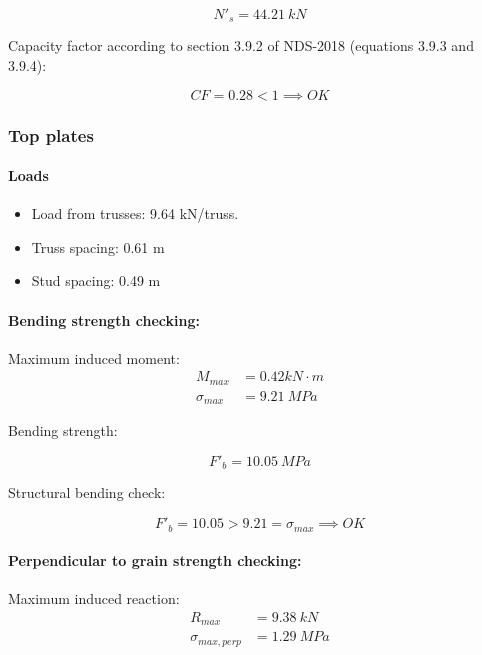 \begin{equation}
  N'_s= 44.21\ kN
\end{equation}

\noindent Capacity factor according to section 3.9.2 of NDS-2018 (equations 3.9.3 and 3.9.4):

\begin{equation}
  CF= 0.28 < 1 \implies OK
\end{equation}

\subsubsection{Top plates}

\paragraph{Loads}

\begin{itemize}
\item Load from trusses: 9.64 kN/truss.
\item Truss spacing: 0.61 m
\item Stud spacing: 0.49 m
\end{itemize}

\paragraph{Bending strength checking:}

\noindent Maximum induced moment:
\begin{align}
  M_{max}&= 0.42 kN \cdot m\\
  \sigma_{max}&= 9.21\ MPa
\end{align}

\noindent Bending strength:

\begin{equation}
  F'_b= 10.05\ MPa
\end{equation}

\noindent Structural bending check:

\begin{equation}
F'_b = 10.05 > 9.21 = \sigma_{max} \implies OK
\end{equation}

\paragraph{Perpendicular to grain strength checking:}

\noindent Maximum induced reaction:
\begin{align}
  R_{max}&= 9.38\ kN\\
  \sigma_{max,perp}&= 1.29\ MPa
\end{align}

